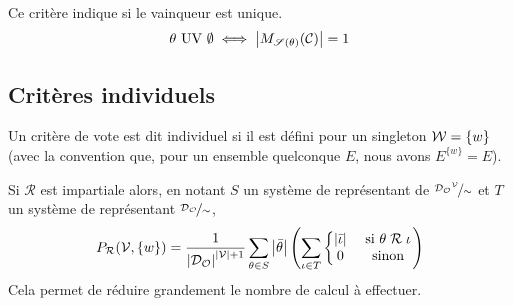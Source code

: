 \begin{definition}
	Ce critère indique si le vainqueur est unique.
	\begin{equation}
		\theta \text{ UV } \emptyset
		\iff
		\left| M_{\mathscr{S}(\theta)}(\mathcal{C}) \right| = 1
	\end{equation}
\end{definition}

\subsection{Critères individuels}

Un critère de vote est dit individuel si il est défini pour un singleton $\mathcal{W} = \{w\}$ (avec la convention que, pour un ensemble quelconque $E$, nous avons $E^{\{w\}} = E$).

\begin{theoreme}
	Si $\mathcal{R}$ est impartiale alors,
	en notant $S$ un système de représentant de $\nicefrac{{\mathcal{D}_\mathcal{O}}^{\mathcal{V}}}{\sim}$ et $T$ un système de représentant  $\nicefrac{\mathcal{D}_\mathcal{O}}{\sim}$,
	\begin{equation}
		P_\mathcal{R} (\mathcal{V}, \{w\}) =
		\frac{1}{ \left|\mathcal{D}_\mathcal{O}\right| ^ {\left|\mathcal{V}\right| + 1} }
		\sum_{\theta \in S} \left|\bar{\theta}\right|
		\left(
		 \sum_{\iota \in T}
		\left\{\begin{matrix}
			\left|\bar{\iota}\right| &\text{ si } \theta \;\mathcal{R}\; \iota \\
			0 &\text{ sinon}
		\end{matrix}\right.
		\right)
	\end{equation}
	Cela permet de réduire grandement le nombre de calcul à effectuer.
\end{theoreme}

